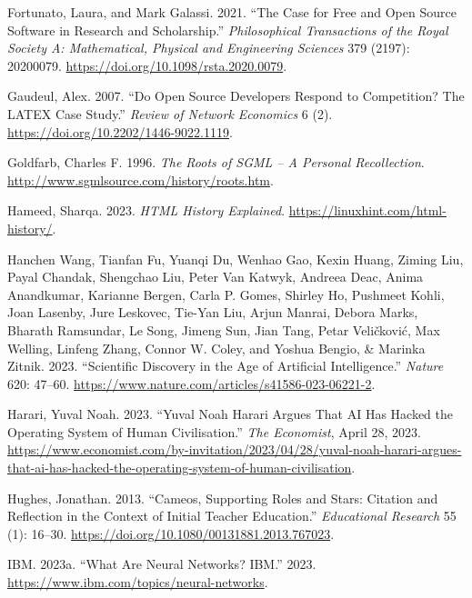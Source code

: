 \documentclass[
  letterpaper,
]{scrbook}
\newlength{\cslhangindent}
\newlength{\cslentryspacingunit} %
\newenvironment{CSLReferences}[2] %
 {%
  \setlength{\parindent}{0pt}
  \ifodd #1
  \let\oldpar\par
  \def\par{\hangindent=\cslhangindent\oldpar}
  \fi
  \setlength{\parskip}{#2\cslentryspacingunit}
 }%
 {}
\begin{document}
\begin{CSLReferences}{1}{0}
\leavevmode{}%
Fortunato, Laura, and Mark Galassi. 2021. {``The Case for Free and Open
Source Software in Research and Scholarship.''} \emph{Philosophical
Transactions of the Royal Society A: Mathematical, Physical and
Engineering Sciences} 379 (2197): 20200079.
\url{https://doi.org/10.1098/rsta.2020.0079}.

\leavevmode{}%
Gaudeul, Alex. 2007. {``Do {Open Source Developers Respond} to
{Competition}? {The LATEX Case Study}.''} \emph{Review of Network
Economics} 6 (2). \url{https://doi.org/10.2202/1446-9022.1119}.

\leavevmode{}%
Goldfarb, Charles F. 1996. \emph{The {Roots} of {SGML} -- {A Personal
Recollection}}. \url{http://www.sgmlsource.com/history/roots.htm}.

\leavevmode{}%
Hameed, Sharqa. 2023. \emph{{HTML History} \textbar{} {Explained}}.
\url{https://linuxhint.com/html-history/}.

\leavevmode{}%
Hanchen Wang, Tianfan Fu, Yuanqi Du, Wenhao Gao, Kexin Huang, Ziming
Liu, Payal Chandak, Shengchao Liu, Peter Van Katwyk, Andreea Deac, Anima
Anandkumar, Karianne Bergen, Carla P. Gomes, Shirley Ho, Pushmeet Kohli,
Joan Lasenby, Jure Leskovec, Tie-Yan Liu, Arjun Manrai, Debora Marks,
Bharath Ramsundar, Le Song, Jimeng Sun, Jian Tang, Petar Veličković, Max
Welling, Linfeng Zhang, Connor W. Coley, and Yoshua Bengio, \& Marinka
Zitnik. 2023. {``Scientific Discovery in the Age of Artificial
Intelligence.''} \emph{Nature} 620: 47--60.
\url{https://www.nature.com/articles/s41586-023-06221-2}.

\leavevmode{}%
Harari, Yuval Noah. 2023. {``Yuval {Noah Harari} Argues That {AI} Has
Hacked the Operating System of Human Civilisation.''} \emph{The
Economist}, April 28, 2023.
\url{https://www.economist.com/by-invitation/2023/04/28/yuval-noah-harari-argues-that-ai-has-hacked-the-operating-system-of-human-civilisation}.

\leavevmode{}%
Hughes, Jonathan. 2013. {``Cameos, Supporting Roles and Stars: Citation
and Reflection in the Context of Initial Teacher Education.''}
\emph{Educational Research} 55 (1): 16--30.
\url{https://doi.org/10.1080/00131881.2013.767023}.

\leavevmode{}%
IBM. 2023a. {``What Are {Neural Networks}? \textbar{} {IBM}.''} 2023.
\url{https://www.ibm.com/topics/neural-networks}.


\end{CSLReferences}
\end{document}
